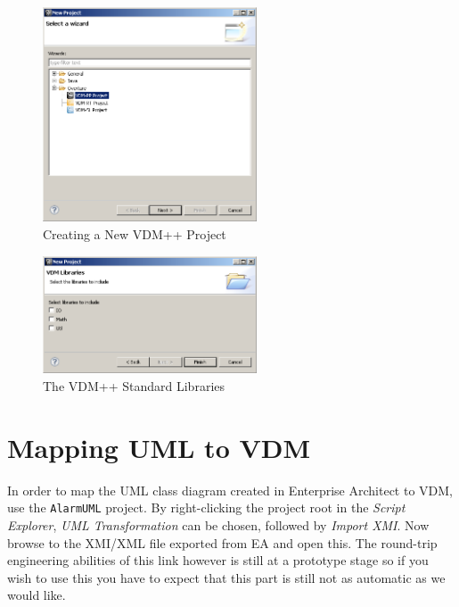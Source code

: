 \begin{figure}[!htb]
\begin{center}
  \includegraphics[width=2.5in]{figures/newoverturePPproject}
  \caption[labelInTOC]{Creating a New VDM++ Project}
  \label{fig:newoverturePPproject}
\end{center}
\end{figure}

\begin{figure}[!htb]
\begin{center}
  \includegraphics[width=2.5in]{figures/stdlibs}
  \caption[labelInTOC]{The VDM++ Standard Libraries}
  \label{fig:stdlibs}
\end{center}
\end{figure}

\section{Mapping UML to  VDM}\label{sec:fromUMLtoVDM}\label{sec:syntaxcheck}
\label{sec:typecheck}

In order to map the UML class diagram created in Enterprise Architect
to VDM, use the \texttt{AlarmUML} project.
By right-clicking the project
root in the \emph{Script Explorer}, \emph{UML Transformation} can be
chosen, followed by \emph{Import XMI}. Now browse to the XMI/XML file
exported from EA and open this. The round-trip engineering abilities of
this link however is still at a prototype stage so if you wish to use
this you have to expect that this part is still not as automatic as we
would like.

